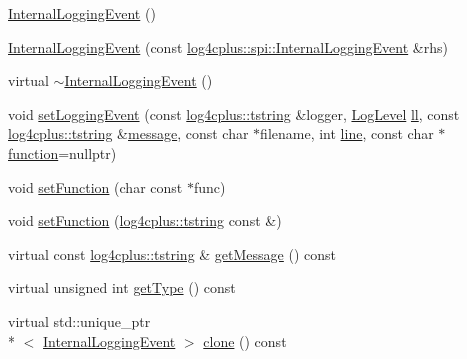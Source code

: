 \begin{DoxyCompactItemize}
\item 
\hyperlink{classlog4cplus_1_1spi_1_1InternalLoggingEvent_a18435efadf1eb94366257c7249f74b41}{Internal\-Logging\-Event} ()
\item 
\hyperlink{classlog4cplus_1_1spi_1_1InternalLoggingEvent_a07b0b8075b115c874d832b5d9aafbe26}{Internal\-Logging\-Event} (const \hyperlink{classlog4cplus_1_1spi_1_1InternalLoggingEvent}{log4cplus\-::spi\-::\-Internal\-Logging\-Event} \&rhs)
\item 
virtual \hyperlink{classlog4cplus_1_1spi_1_1InternalLoggingEvent_a383da32a3ebbddd15103bb54dd03391b}{$\sim$\-Internal\-Logging\-Event} ()
\item 
void \hyperlink{classlog4cplus_1_1spi_1_1InternalLoggingEvent_a60ed4665feac0d241e148147e7316e80}{set\-Logging\-Event} (const \hyperlink{namespacelog4cplus_a3c9287f6ebcddc50355e29d71152117b}{log4cplus\-::tstring} \&logger, \hyperlink{namespacelog4cplus_abd332cc8c98fefcbbdcf57b6b3867de9}{Log\-Level} \hyperlink{classlog4cplus_1_1spi_1_1InternalLoggingEvent_a2d33ee369b9b04f1a92714e0ce5b1b4f}{ll}, const \hyperlink{namespacelog4cplus_a3c9287f6ebcddc50355e29d71152117b}{log4cplus\-::tstring} \&\hyperlink{classlog4cplus_1_1spi_1_1InternalLoggingEvent_a1b064cc96a13f36f3f09463f624d839d}{message}, const char $\ast$filename, int \hyperlink{classlog4cplus_1_1spi_1_1InternalLoggingEvent_a7729e046e59e1a70133045a54f418d82}{line}, const char $\ast$\hyperlink{classlog4cplus_1_1spi_1_1InternalLoggingEvent_a1a0f753c6187c68190730a6dae25870e}{function}=nullptr)
\item 
void \hyperlink{classlog4cplus_1_1spi_1_1InternalLoggingEvent_ac1ae4c3c384a6446736c20c591e18029}{set\-Function} (char const $\ast$func)
\item 
void \hyperlink{classlog4cplus_1_1spi_1_1InternalLoggingEvent_a7eeccdc9d99786501e5a35c39a7ac416}{set\-Function} (\hyperlink{namespacelog4cplus_a3c9287f6ebcddc50355e29d71152117b}{log4cplus\-::tstring} const \&)
\item 
virtual const \hyperlink{namespacelog4cplus_a3c9287f6ebcddc50355e29d71152117b}{log4cplus\-::tstring} \& \hyperlink{classlog4cplus_1_1spi_1_1InternalLoggingEvent_a3585d55fdea2fae2f4a6795036eadfa8}{get\-Message} () const 
\item 
virtual unsigned int \hyperlink{classlog4cplus_1_1spi_1_1InternalLoggingEvent_a6362e534f06e32277b2e5ede64b34c64}{get\-Type} () const 
\item 
virtual std\-::unique\-\_\-ptr\\*
$<$ \hyperlink{classlog4cplus_1_1spi_1_1InternalLoggingEvent}{Internal\-Logging\-Event} $>$ \hyperlink{classlog4cplus_1_1spi_1_1InternalLoggingEvent_a867499f28d7cc626c5a4d7eb3cb29b94}{clone} () const 

\end{DoxyCompactItemize}
